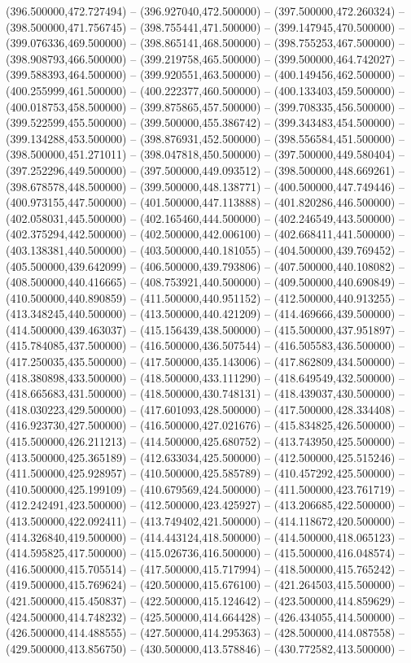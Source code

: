 (396.500000,472.727494) -- (396.927040,472.500000) -- (397.500000,472.260324) -- (398.500000,471.756745) -- (398.755441,471.500000) -- (399.147945,470.500000) -- (399.076336,469.500000) -- (398.865141,468.500000) -- (398.755253,467.500000) -- (398.908793,466.500000) -- (399.219758,465.500000) -- (399.500000,464.742027) -- (399.588393,464.500000) -- (399.920551,463.500000) -- (400.149456,462.500000) -- (400.255999,461.500000) -- (400.222377,460.500000) -- (400.133403,459.500000) -- (400.018753,458.500000) -- (399.875865,457.500000) -- (399.708335,456.500000) -- (399.522599,455.500000) -- (399.500000,455.386742) -- (399.343483,454.500000) -- (399.134288,453.500000) -- (398.876931,452.500000) -- (398.556584,451.500000) -- (398.500000,451.271011) -- (398.047818,450.500000) -- (397.500000,449.580404) -- (397.252296,449.500000) -- (397.500000,449.093512) -- (398.500000,448.669261) -- (398.678578,448.500000) -- (399.500000,448.138771) -- (400.500000,447.749446) -- (400.973155,447.500000) -- (401.500000,447.113888) -- (401.820286,446.500000) -- (402.058031,445.500000) -- (402.165460,444.500000) -- (402.246549,443.500000) -- (402.375294,442.500000) -- (402.500000,442.006100) -- (402.668411,441.500000) -- (403.138381,440.500000) -- (403.500000,440.181055) -- (404.500000,439.769452) -- (405.500000,439.642099) -- (406.500000,439.793806) -- (407.500000,440.108082) -- (408.500000,440.416665) -- (408.753921,440.500000) -- (409.500000,440.690849) -- (410.500000,440.890859) -- (411.500000,440.951152) -- (412.500000,440.913255) -- (413.348245,440.500000) -- (413.500000,440.421209) -- (414.469666,439.500000) -- (414.500000,439.463037) -- (415.156439,438.500000) -- (415.500000,437.951897) -- (415.784085,437.500000) -- (416.500000,436.507544) -- (416.505583,436.500000) -- (417.250035,435.500000) -- (417.500000,435.143006) -- (417.862809,434.500000) -- (418.380898,433.500000) -- (418.500000,433.111290) -- (418.649549,432.500000) -- (418.665683,431.500000) -- (418.500000,430.748131) -- (418.439037,430.500000) -- (418.030223,429.500000) -- (417.601093,428.500000) -- (417.500000,428.334408) -- (416.923730,427.500000) -- (416.500000,427.021676) -- (415.834825,426.500000) -- (415.500000,426.211213) -- (414.500000,425.680752) -- (413.743950,425.500000) -- (413.500000,425.365189) -- (412.633034,425.500000) -- (412.500000,425.515246) -- (411.500000,425.928957) -- (410.500000,425.585789) -- (410.457292,425.500000) -- (410.500000,425.199109) -- (410.679569,424.500000) -- (411.500000,423.761719) -- (412.242491,423.500000) -- (412.500000,423.425927) -- (413.206685,422.500000) -- (413.500000,422.092411) -- (413.749402,421.500000) -- (414.118672,420.500000) -- (414.326840,419.500000) -- (414.443124,418.500000) -- (414.500000,418.065123) -- (414.595825,417.500000) -- (415.026736,416.500000) -- (415.500000,416.048574) -- (416.500000,415.705514) -- (417.500000,415.717994) -- (418.500000,415.765242) -- (419.500000,415.769624) -- (420.500000,415.676100) -- (421.264503,415.500000) -- (421.500000,415.450837) -- (422.500000,415.124642) -- (423.500000,414.859629) -- (424.500000,414.748232) -- (425.500000,414.664428) -- (426.434055,414.500000) -- (426.500000,414.488555) -- (427.500000,414.295363) -- (428.500000,414.087558) -- (429.500000,413.856750) -- (430.500000,413.578846) -- (430.772582,413.500000) -- 